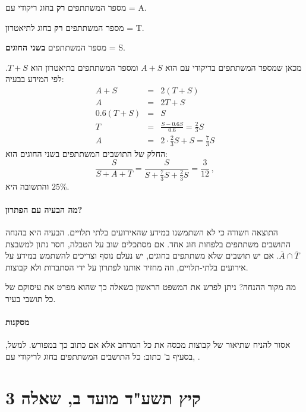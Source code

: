 \documentclass[12pt,a4paper]{article}
\begin{document}
מספר המשתתפים
\textbf{רק}
בחוג ריקודי עם = A.

מספר המשתתפים
\textbf{רק}
בחוג לתיאטרון = T.

מספר המשתתפים
\textbf{בשני החוגים}
= S.

מכאן שמספר המשתתפים בריקודי עם הוא $A+S$ ומספר המשתתפים בתיאטרון הוא $T+S$. לפי המידע בבעיה:
\begin{eqnarray*}
A + S &=& 2(T + S)\\
A &=& 2T + S\\
0.6(T+S) &=& S\\
T &=& \frac{S-0.6S}{0.6} = \frac{2}{3} S\\
A &=& 2\cdot \frac{2}{3} S + S = \frac{7}{3}S
\end{eqnarray*}
החלק של התושבים המשתתפים בשני החוגים הוא:
\[
\frac{S}{S+A+T} = \frac{S}{S+\frac{7}{3}S+\frac{2}{3}S} = \frac{3}{12}\,,
\]
והתשובה היא $25\%$.

\paragraph{מה הבעיה עם הפתרון?}

התוצאה חשודה כי לא השתמשנו במידע שהאירועים בלתי תלויים. הבעיה היא בהנחה
\textbf{} 
התושבים משתתפים בלפחות חוג אחד. אם מסתכלים שוב על הטבלה, חסר נתון למשבצת
$\overline{A}\cap\overline{T}$.
אם יש תושבים שלא משתתפים בחוגים, יש נעלם נוסף וצריכים להשתמש במידע על אירועים בלתי-תלויים, וזה מחזיר אותנו לפתרון על ידי הסתברות ולא קבוצות.

מה מקור ההנחה? ניתן לפרש את המשפט הראשון בשאלה כך שהוא מפרט את עיסוקם של כל תושבי בעיר.

\paragraph{מסקנות}

אסור להניח שתיאור של קבוצות מכסה את כל המרחב אלא אם כתוב כך במפורש. למשל, בסעיף ב' כתוב: כל התושבים המשתתפים בחוג לריקודי עם,
\textbf{}.



\newpage


\section*{קיץ תשע"ד מועד ב, שאלה 3}
\end{document}
